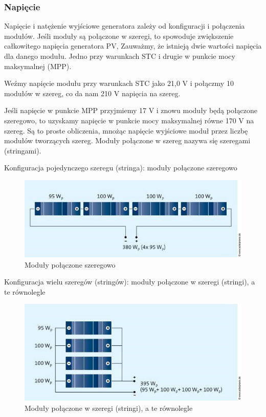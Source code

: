 \documentclass[12pt,a4paper]{article}
\begin{document}
\subsubsection{Napięcie}

Napięcie i natężenie wyjściowe generatora zależy od konfiguracji i 
połączenia modułów. Jeśli moduły są połączone w szeregi, to spowoduje 
zwiększenie całkowitego napięcia generatora PV, Zauważmy, że istnieją 
dwie wartości napięcia dla danego modułu. Jedno przy warunkach STC i 
drugie w punkcie mocy maksymalnej (MPP). 

Weźmy napięcie modułu przy warunkach STC jako 21,0 V i połączmy 10 
modułów w szereg, co da nam 210 V napięcia na szereg. 

Jeśli napięcie w punkcie MPP przyjmiemy 17 V i znowu moduły będą połączone szeregowo, to uzyskamy napięcie w punkcie mocy maksymalnej równe 170 V na szereg.
Są to proste obliczenia, mnożąc napięcie wyjściowe moduł przez liczbę modułów tworzących szereg. Moduły połączone w szereg nazywa się szeregami (stringami). 

Konfiguracja pojedynczego szeregu (stringa): moduły połączone szeregowo 

\begin{figure}[H]
\centering
\caption{Moduły połączone szeregowo}
\includegraphics[natwidth=15.92cm,natheight=5.67cm]{media/image12.jpg}
\end{figure}
 
Konfiguracja wielu szeregów (stringów): moduły połączone w szeregi 
(stringi), a te równolegle 

\begin{figure}[H]
\centering
\caption{Moduły połączone w szeregi (stringi), a te równolegle }
\includegraphics[natwidth=15.92cm,natheight=7.11cm]{media/image13.jpg}
\end{figure}
 
\end{document}

